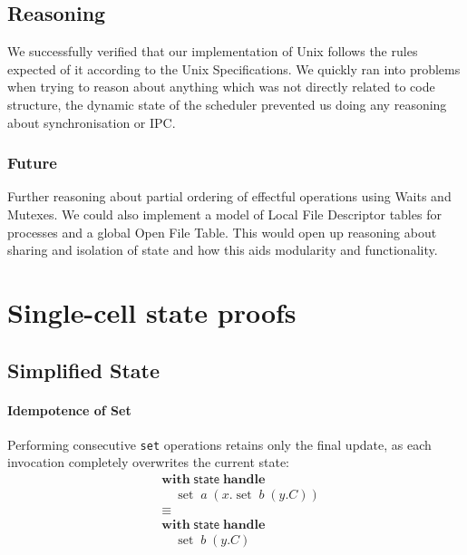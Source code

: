 \documentclass[logo,bsc,singlespacing,parskip]{infthesis}
\begin{document}
\section{Reasoning}
We successfully verified that our implementation of Unix follows the rules expected of it according to the Unix Specifications. We quickly ran into problems when trying to reason about anything which was not directly related to code structure, the dynamic state of the scheduler prevented us doing any reasoning about synchronisation or IPC.
\subsection*{Future}
Further reasoning about partial ordering of effectful operations using Waits and Mutexes. We could also implement a model of Local File Descriptor tables for processes and a global Open File Table. This would open up reasoning about sharing and isolation of state and how this aids modularity and functionality.  

% 




\appendix

\chapter{Single-cell state proofs} 

\section{Simplified State} \label{full-simplified-single-cell-state-proof}

\subsubsection*{Idempotence of Set}
Performing consecutive \lstinline{set} operations retains only the final update, as each invocation completely overwrites the current state:
\[
\begin{aligned}
    &\mathsf{\textbf{with}} \; \mathsf{state} \; \mathsf{\textbf{handle}} \\
    &\quad \operatorname{set} \; a \; (x. \operatorname{set} \; b \; (y. C)) \\
    &\equiv \\
    &\mathsf{\textbf{with}} \; \mathsf{state} \; \mathsf{\textbf{handle}} \\
    &\quad \operatorname{set} \; b \; (y. C)
\end{aligned}
\]
\end{document}
